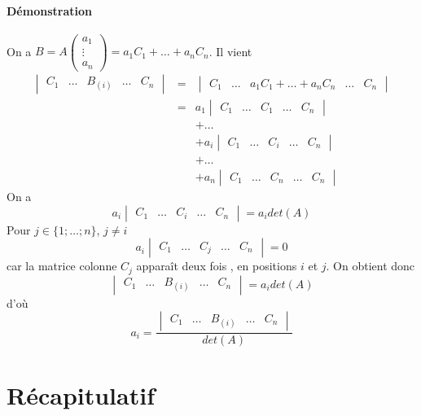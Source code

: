 \paragraph{Démonstration} On a $B = A \begin{pmatrix} a_1 \\ \vdots \\ a_n \end{pmatrix} = a_1 C_1 + \ldots + a_n C_n$. Il vient
\begin{eqnarray*}
  \begin{vmatrix} C_1 & \ldots & B_{(i)} & \ldots & C_n \end{vmatrix} &=& \begin{vmatrix} C_1 & \ldots &  a_1 C_1 + \ldots + a_n C_n & \ldots & C_n \end{vmatrix} \\
    &=& a_1 \begin{vmatrix} C_1 & \ldots & C_1 & \ldots & C_n \end{vmatrix} \\
    &&+ \ldots \\
    &&+ a_i \begin{vmatrix} C_1 & \ldots & C_i & \ldots & C_n \end{vmatrix} \\
    &&+ \ldots \\
    &&+ a_n \begin{vmatrix} C_1 & \ldots & C_n & \ldots & C_n \end{vmatrix}
\end{eqnarray*}
On a 
$$a_i \begin{vmatrix} C_1 & \ldots & C_i & \ldots & C_n \end{vmatrix} = a_i det(A)$$
Pour $j \in \{1; \ldots; n\}$, $j\neq i$
$$a_i \begin{vmatrix} C_1 & \ldots & C_j & \ldots & C_n \end{vmatrix} = 0$$
car la matrice colonne $C_j$ apparaît deux fois , en positions $i$ et $j$. On obtient donc 
$$\begin{vmatrix} C_1 & \ldots & B_{(i)} & \ldots & C_n \end{vmatrix} = a_i det(A)$$
d'où
$$a_i = \frac{\begin{vmatrix} C_1 & \ldots & B_{(i)} & \ldots & C_n \end{vmatrix}}{det(A)}$$

%
%
\section{Récapitulatif}
%
%

